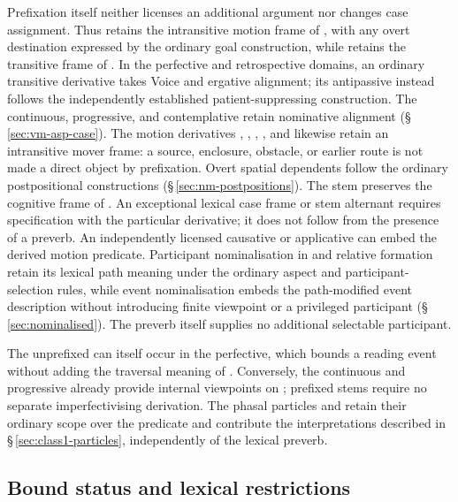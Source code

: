 Prefixation itself neither licenses an additional argument nor changes case
assignment. Thus  retains the intransitive motion frame of
, with any overt destination expressed by the ordinary goal
construction, while  retains the transitive frame of
. In the perfective and retrospective domains, an ordinary
transitive derivative takes Voice  and ergative alignment; its
antipassive instead follows the independently established patient-suppressing
construction. The continuous, progressive, and contemplative retain nominative
alignment (§\,\ref{sec:vm-asp-case}). The motion derivatives ,
,
, , and  likewise retain
an intransitive mover frame: a source, enclosure, obstacle, or earlier route
is not made a direct object by prefixation. Overt spatial dependents follow
the ordinary postpositional constructions (§\,\ref{sec:nm-postpositions}).
The stem  preserves the cognitive frame of . An exceptional
lexical case frame or stem alternant requires specification with the particular
derivative; it does not follow from the presence of a preverb. An independently
licensed causative or applicative can embed the derived motion predicate.
Participant nominalisation in  and relative formation
retain its lexical path meaning under the ordinary aspect and
participant-selection rules, while event nominalisation embeds the
path-modified event description without introducing finite viewpoint or a
privileged participant (§\,\ref{sec:nominalised}). The preverb itself supplies
no additional selectable participant.

The unprefixed  can itself occur in the perfective, which bounds
a reading event without adding the traversal meaning of .
Conversely, the continuous and progressive already provide internal viewpoints
on ; prefixed stems require no separate imperfectivising
derivation. The phasal particles  and  retain their ordinary
scope over the predicate and contribute the interpretations described in
§\,\ref{sec:class1-particles}, independently of the lexical preverb.

\subsection{Bound status and lexical restrictions}

